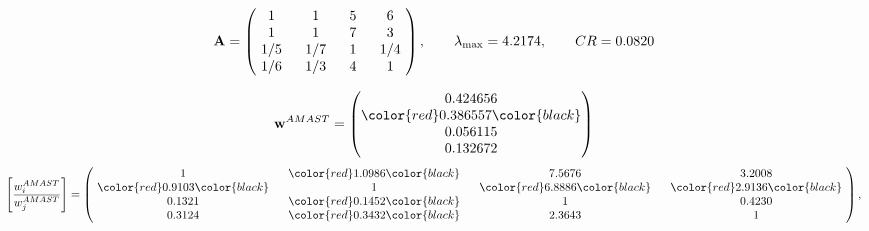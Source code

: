 \begin{example}
\begin{equation*}
\mathbf{A} =
\begin{pmatrix}
$\,\,$ 1 $\,\,$ & $\,\,$1$\,\,$ & $\,\,$5$\,\,$ & $\,\,$6 $\,\,$ \\
$\,\,$ 1 $\,\,$ & $\,\,$ 1 $\,\,$ & $\,\,$7$\,\,$ & $\,\,$3 $\,\,$ \\
$\,\,$ 1/5$\,\,$ & $\,\,$ 1/7$\,\,$ & $\,\,$ 1 $\,\,$ & $\,\,$ 1/4 $\,\,$ \\
$\,\,$ 1/6$\,\,$ & $\,\,$ 1/3$\,\,$ & $\,\,$4$\,\,$ & $\,\,$ 1  $\,\,$ \\
\end{pmatrix},
\qquad
\lambda_{\max} =
4.2174,
\qquad
CR = 0.0820
\end{equation*}

\begin{equation*}
\mathbf{w}^{AMAST} =
\begin{pmatrix}
0.424656\\
\color{red} 0.386557\color{black} \\
0.056115\\
0.132672
\end{pmatrix}\end{equation*}
\begin{equation*}
\left[ \frac{{w}^{AMAST}_i}{{w}^{AMAST}_j} \right] =
\begin{pmatrix}
$\,\,$ 1 $\,\,$ & $\,\,$\color{red} 1.0986\color{black} $\,\,$ & $\,\,$7.5676$\,\,$ & $\,\,$3.2008$\,\,$ \\
$\,\,$\color{red} 0.9103\color{black} $\,\,$ & $\,\,$ 1 $\,\,$ & $\,\,$\color{red} 6.8886\color{black} $\,\,$ & $\,\,$\color{red} 2.9136\color{black}   $\,\,$ \\
$\,\,$0.1321$\,\,$ & $\,\,$\color{red} 0.1452\color{black} $\,\,$ & $\,\,$ 1 $\,\,$ & $\,\,$0.4230 $\,\,$ \\
$\,\,$0.3124$\,\,$ & $\,\,$\color{red} 0.3432\color{black} $\,\,$ & $\,\,$2.3643$\,\,$ & $\,\,$ 1  $\,\,$ \\
\end{pmatrix},
\end{equation*}


\end{example}
